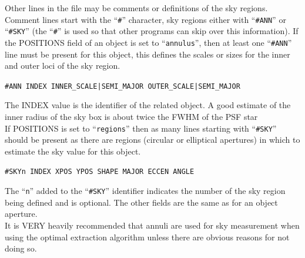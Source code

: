 \documentclass[twoside,11pt,nolof]{starlink}
\providecommand{\ft}[1]{``\texttt{#1}''}
\begin{document}
{{{      Other lines in the file may be comments or definitions of the sky
      regions. Comment lines start with the \ft{\#} character, sky regions
      either with \ft{\#ANN} or \ft{\#SKY} (the \ft{\#} is used so that other
      programs can skip over this information). If the POSITIONS field
      of an object is set to \ft{annulus}, then at least one \ft{\#ANN} line must
      be present for this object, this defines the scales or sizes for
      the inner and outer loci of the sky region.
       \begin{description}
          \item  \hspace*{1cm} \texttt{\#ANN INDEX INNER\_SCALE|SEMI\_MAJOR OUTER\_SCALE|SEMI\_MAJOR}
       \end{description}
      The INDEX value is the identifier of the related object. A good
      estimate of the inner radius of the sky box is about twice the
      FWHM of the PSF star\\

      If POSITIONS is set to \ft{regions} then as many lines starting with
      \ft{\#SKY} should be present as there are regions (circular or
      elliptical apertures) in which to estimate the sky value for this
      object.
       \begin{description}
          \item  \hspace*{1cm} \texttt{\#SKYn INDEX XPOS YPOS SHAPE MAJOR ECCEN
                                        ANGLE}
       \end{description}
      The \ft{n} added to the \ft{\#SKY} identifier indicates the number of
      the sky region being defined and is optional. The other fields
      are the same as for an object aperture.\\

      It is VERY heavily recommended that annuli are used for sky measurement
      when using the optimal extraction algorithm unless there are obvious
      reasons for not doing so.

    }
   }
}
\newpage
\end{document}
